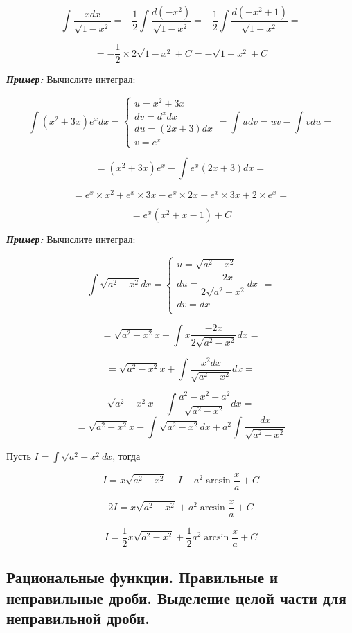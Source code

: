 \documentclass[a4paper,12pt]{article}
\theoremstyle{plain} %
\theoremstyle{definition} %
\theoremstyle{remark} %
\begin{document}
\[
	\int \frac{x dx}{\sqrt{1 - x^2}} = - \frac{1}{2} \int \frac{d(-x^2)}{\sqrt{1 - x^2}} = - \frac{1}{2} \int \frac{d(-x^2 + 1)}{\sqrt{1 - x^2}} =
\]

\[ = - \frac{1}{2} \times 2 \sqrt{1 - x^2} + C = -\sqrt{1 - x^2} + C \]

\textit{\textbf{Пример:}} Вычислите интеграл:

\[
	\int (x^2 + 3x) e^x dx =
	\begin{cases}
		u = x^2 + 3x    \\
		dv = d^xdx      \\
		du = (2x + 3)dx \\
		v = e^x
	\end{cases} =
	\int udv = uv - \int vdu =
\]

\[
	= (x^2 + 3x)e^x - \int e^x (2x + 3) dx =
\]

\[ = e^x \times x^2 + e^x \times 3x - e^x \times 2x - e^x \times 3x + 2 \times e^x =
\]

\[
	= e^x (x^2 + x - 1) + C
\]

\textit{\textbf{Пример:}} Вычислите интеграл:

\[
	\int \sqrt{a^2 - x^2}dx =
	\begin{cases}
		u = \sqrt{a^2 - x^2}                   \\
		du = \dfrac{-2x}{2\sqrt{a^2 - x^2}} dx \\
		dv = dx                                \\
	\end{cases}
	=
\]

\[ = \sqrt{a^2 - x^2}x - \int x \dfrac{-2x}{2\sqrt{a^2 - x^2}} dx =
\]

\[
	= \sqrt{a^2 - x^2}x + \int \frac{x^2 dx}{\sqrt{a^2 - x^2}} dx =
\]

\[ \sqrt{a^2 - x^2}x - \int \frac{a^2 - x^2 - a^2}{\sqrt{a^2 - x^2}} dx =
\]
\[
	= \sqrt{a^2 - x^2}x - \int \sqrt{a^2 - x^2}dx + a^2 \int \frac{dx}{\sqrt{a^2 - x^2}}
\]

Пусть $ I = \int \sqrt{a^2 - x^2}dx $, тогда

\[
	I = x \sqrt{a^2 - x^2} - I + a^2 \arcsin{\frac{x}{a}} + C
\]

\[
	2I = x\sqrt{a^2 - x^2} + a^2 \arcsin{\frac{x}{a}} + C
\]

\[
	I = \frac{1}{2} x \sqrt{a^2 - x^2} + \frac{1}{2} a^2 \arcsin{\frac{x}{a}} + C
\]

\newpage
\subsection*{Рациональные функции. Правильные и неправильные дроби. Выделение целой части для неправильной дроби.}
\end{document}
